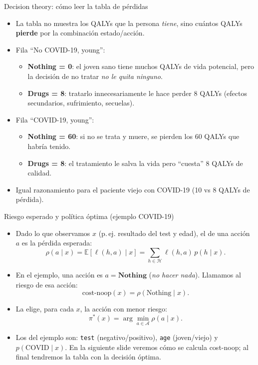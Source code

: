 \begin{frame}{Decision theory: cómo leer la tabla de pérdidas}
\small
\begin{itemize}
  \item La tabla no muestra los QALYs que la persona \emph{tiene}, sino cuántos QALYs \textbf{pierde} por la combinación estado/acción.
  \item Fila “No COVID-19, young”:
  \begin{itemize}\small
    \item \textbf{Nothing = 0}: el joven sano tiene muchos QALYs de vida potencial, pero la decisión de no tratar \emph{no le quita ninguno}.
    \item \textbf{Drugs = 8}: tratarlo innecesariamente le hace perder 8 QALYs (efectos secundarios, sufrimiento, secuelas).
  \end{itemize}
  \item Fila “COVID-19, young”:
  \begin{itemize}\small
    \item \textbf{Nothing = 60}: si no se trata y muere, se pierden los 60 QALYs que habría tenido.
    \item \textbf{Drugs = 8}: el tratamiento le salva la vida pero “cuesta” 8 QALYs de calidad.
  \end{itemize}
  \item Igual razonamiento para el paciente viejo con COVID-19 (10 vs 8 QALYs de pérdida).
\end{itemize}
\end{frame}

\begin{frame}{Riesgo esperado y política óptima (ejemplo COVID-19)}
\small
\begin{itemize}
  \item Dado lo que observamos \(x\) (p.\,ej. resultado del test y edad), el  de una acción \(a\) es la pérdida esperada:
  \[
    \rho(a\mid x) = \mathbb{E}[\ell(h,a)\mid x] = \sum_{h\in\mathcal{H}} \ell(h,a)\,p(h\mid x).
  \]
  \item En el ejemplo, una acción es \(a=\textbf{Nothing}\) (\emph{no hacer nada}). Llamamos  al riesgo de esa acción:
  \[
    \text{cost-noop}(x) = \rho(\text{Nothing}\mid x).
  \]
  \item La  elige, para cada \(x\), la acción con menor riesgo:
  \[
    \pi^*(x) = \arg\min_{a\in\mathcal{A}} \rho(a\mid x).
  \]
  \item Los  del ejemplo son: \texttt{test} (negativo/positivo), \texttt{age} (joven/viejo) y \(p(\text{COVID}\mid x)\). En la siguiente slide veremos cómo se calcula cost-noop; al final tendremos la tabla con la decisión óptima.
\end{itemize}
\end{frame}

